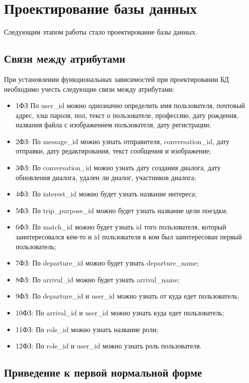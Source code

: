 \section{Проектирование базы данных}

Следующим этапом работы стало проектирование базы данных.

\subsection{Связи между атрибутами}

При установлении функциональных зависимостей при проектировании БД необходимо учесть следующие связи между атрибутами:

\begin{itemize}
    \item 1ФЗ\: По user\_id можно однозначно определить имя пользователя, почтовый адрес, хэш пароля, пол, текст о пользователе, профессию, дату рождения, названия файла с изображением пользователя, дату регистрации;
    \item 2ФЗ: По message\_id можно узнать отправителя, conversation\_id, дату отправки, дату редактирования, текст сообщения и изображение;
    \item 3ФЗ: По conversation\_id можно узнать дату создания диалога, дату обновления диалога, удален ли диалог, участников диалога;
    \item 4ФЗ: По interest\_id можно будет узнать название интереса;
    \item 5ФЗ: По trip\_purpose\_id можно будет узнать название цели поездки;
    \item 6ФЗ: По match\_id можно будет узнать id того пользователя, который заинтересовался кем-то и id пользователя в ком был заинтересован первый пользователь;
    \item 7ФЗ: По departure\_id можно будет узнать departure\_name;
    \item 8ФЗ: По arrival\_id можно будет узнать arrival\_name;
    \item 9ФЗ: По departure\_id и user\_id можно узнать от куда едет пользователь;
    \item 10ФЗ: По arrival\_id и user\_id можно узнать куда едет пользователь;
    \item 11ФЗ: По role\_id можно узнать название роли;
    \item 12ФЗ: По role\_id и user\_id можно узнать роль пользователя.
\end{itemize}

\subsection{Приведение к первой нормальной форме}

